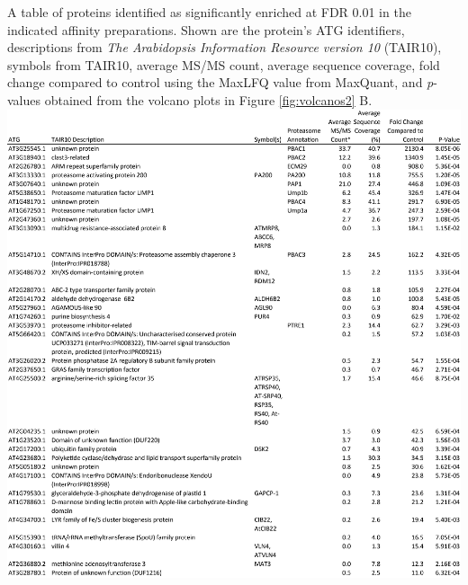 \begin{table}
	{A table of proteins identified as significantly enriched at FDR 0.01 in the indicated affinity preparations.  Shown are the protein's ATG identifiers, descriptions from \textit{The Arabidopsis Information Resource version 10} (TAIR10), symbols from TAIR10, average MS/MS count, average sequence coverage, fold change compared to control using the MaxLFQ value from MaxQuant, and \textit{p}-values obtained from the volcano plots in Figure \ref{fig:volcanos2} B.}	
\includegraphics[width=\columnwidth]{Proteasome/pag1plus.png}
\label{table:pag1plus}
\end{table}
\clearpage


